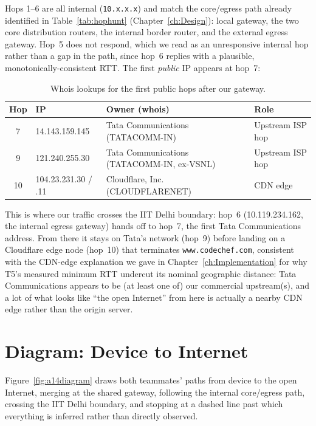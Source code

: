 Hops 1--6 are all internal (\texttt{10.x.x.x}) and match the core/egress path already identified
in Table~\ref{tab:hophunt} (Chapter~\ref{ch:Design}): local gateway, the two core distribution
routers, the internal border router, and the external egress gateway. Hop~5 does not respond,
which we read as an unresponsive internal hop rather than a gap in the path, since hop~6 replies
with a plausible, monotonically-consistent RTT. The first \emph{public} IP appears at hop~7:

\begin{table}[H]
\centering
\caption{Whois lookups for the first public hops after our gateway.}
\label{tab:whoispublic}
\footnotesize
\begin{tabular}{@{}cp{2.7cm}p{5.8cm}p{2.8cm}@{}}
\toprule
Hop & IP & Owner (whois) & Role \\
\midrule
7 & 14.143.159.145 & Tata Communications (TATACOMM-IN) & Upstream ISP hop \\
9 & 121.240.255.30 & Tata Communications (TATACOMM-IN, ex-VSNL) & Upstream ISP hop \\
10 & 104.23.231.30 / .11 & Cloudflare, Inc. (CLOUDFLARENET) & CDN edge \\
\bottomrule
\end{tabular}
\end{table}

This is where our traffic crosses the IIT Delhi boundary: hop~6 (10.119.234.162, the internal
egress gateway) hands off to hop~7, the first Tata Communications address. From there it stays
on Tata's network (hop~9) before landing on a Cloudflare edge node (hop~10) that terminates
\texttt{www.codechef.com}, consistent with the CDN-edge explanation we gave in
Chapter~\ref{ch:Implementation} for why T5's measured minimum RTT undercut its nominal
geographic distance: Tata Communications appears to be (at least one of) our commercial
upstream(s), and a lot of what looks like ``the open Internet'' from here is actually a nearby
CDN edge rather than the origin server.

\section{Diagram: Device to Internet}
Figure~\ref{fig:a14diagram} draws both teammates' paths from device to the open Internet,
merging at the shared gateway, following the internal core/egress path, crossing the IIT Delhi
boundary, and stopping at a dashed line past which everything is inferred rather than directly
observed.


